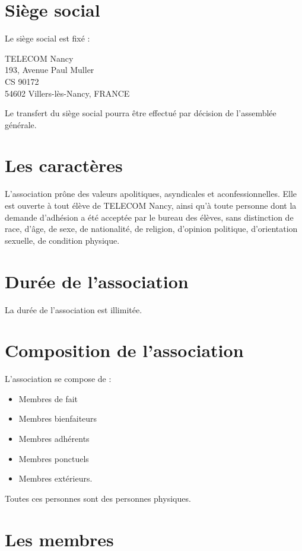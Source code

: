 \documentclass{article}
\begin{document}
	\section{Siège social}
		Le siège social est fixé :
		\begin{center}
			TELECOM Nancy\\
			193, Avenue Paul Muller\\
			CS 90172\\
			54602 Villers-lès-Nancy, FRANCE
		\end{center}

		Le transfert du siège social pourra être effectué par décision de
		l’assemblée générale.

	\section{Les caractères}
	\label{sec:caracteres}
		L’association prône des valeurs apolitiques, asyndicales et
		aconfessionnelles. Elle est ouverte à tout élève de TELECOM Nancy, ainsi
		qu’à toute personne dont la demande d’adhésion a été acceptée par le
		bureau des élèves, sans distinction de race, d'âge, de sexe, de
		nationalité, de religion, d’opinion politique, d’orientation sexuelle,
		de condition physique.

	\section{Durée de l’association}
		La durée de l’association est illimitée.

	\section{Composition de l’association}
		L’association se compose de :
		\begin{itemize}
			\item Membres de fait
			\item Membres bienfaiteurs
			\item Membres adhérents
			\item Membres ponctuels %
			\item Membres extérieurs.
		\end{itemize}
	
		Toutes ces personnes sont des personnes physiques.

	\section{Les membres}
\end{document}
